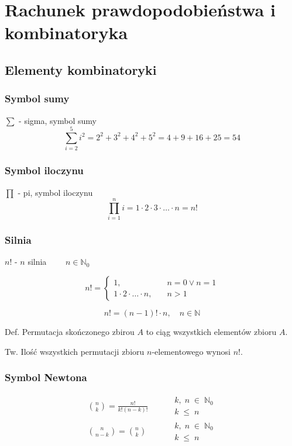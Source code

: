 \documentclass[../Matematyka.tex]{subfiles}
\begin{document}
\section{Rachunek prawdopodobieństwa i kombinatoryka}

\subsection{Elementy kombinatoryki}
\subsubsection{Symbol sumy}
\(\sum\) - sigma, symbol sumy
\[\sum^{5}_{i=2} i^2 = 2^2 + 3^2 + 4^2 + 5^2 = 4 + 9 + 16 + 25 = 54\]

\subsubsection{Symbol iloczynu}
\(\prod\) - pi, symbol iloczynu
\[\prod^{n}_{i=1} i = 1 \cdot 2 \cdot 3 \cdot \ldots \cdot n = n!\]

\subsubsection{Silnia}
\(n!\) - \(n\) silnia \(\qquad n \in \mathbb{N}_0\)

\begin{displaymath}
    n! =
    \begin{cases}
        1,                              & \quad n = 0 \lor n = 1 \\
        1 \cdot 2 \cdot \ldots \cdot n, & \quad n > 1
    \end{cases}
\end{displaymath}

\[n! = (n - 1)! \cdot n, \quad n \in \mathbb{N}\]

Def. Permutacja skończonego zbirou \(A\) to ciąg wszystkich elementów zbioru \(A\).\par
Tw. Ilość wszystkich permutacji zbioru \(n\)-elementowego wynosi \(n!\).

\subsubsection{Symbol Newtona}

\begin{align*}
    \binom{n}{k} =
    \frac{n!}{k!(n-k)!} \qquad &
    \substack{
    k,\;n\;\in\;\mathbb{N}_0     \\
        k\;\leq\;n
    }                            \\
    \binom{n}{n-k} =
    \binom{n}{k} \qquad        &
    \substack{
    k,\;n\;\in\;\mathbb{N}_0     \\
        k\;\leq\;n
    }
\end{align*}
\end{document}
